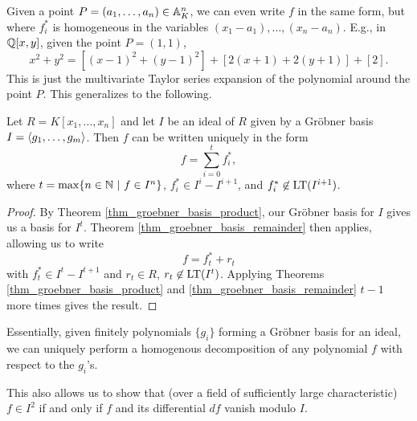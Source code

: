 Given a point $P = (a_1, \ldots, a_n) \in \mathbb{A}_K^n$, we can even write $f$ in the same form,
but where $f_i^*$ is homogeneous in the variables $(x_1 - a_1), \ldots, (x_n - a_n)$.
E.g., in $\mathbb{Q}[x,y]$, given the point $P = (1,1)$, 
\[ x^2 + y^2 = [(x - 1)^2 + (y - 1)^2] + [2(x + 1) + 2(y + 1)] + [2]. \]
This is just the multivariate Taylor series expansion of the polynomial around the point $P$.
This generalizes to the following.

\begin{theorem}
  Let $R = K[x_1, \ldots, x_n]$ and let $I$ be an ideal of $R$ given by a Gr\"obner basis $I = \left\langle g_1, \ldots, g_m \right\rangle$.
  Then $f$ can be written uniquely in the form
  \[ f = \sum_{i=0}^t f_i^*, \]
  where $t = \max\{n \in \mathbb{N} ~|~ f \in I^n\}$, $f_i^* \in I^i - I^{i+1}$, and $f_i^* \not\in \operatorname{LT}(I^{i+1})$.
\end{theorem}
\begin{proof}
  By Theorem \ref{thm_groebner_basis_product}, our Gr\"obner basis for $I$ gives us a basis for $I^t$.
  Theorem \ref{thm_groebner_basis_remainder} then applies, allowing us to write
  \[ f = f^*_t + r_t \]
  with $f^*_t \in I^t - I^{t+1}$ and $r_t \in R$, $r_t \not\in \operatorname{LT}(I^t)$.
  Applying Theorems \ref{thm_groebner_basis_product} and \ref{thm_groebner_basis_remainder} $t-1$ more times gives the result.
\end{proof}

Essentially, given finitely polynomials $\{ g_i \}$ forming a Gr\"obner basis for an ideal,
we can uniquely perform a homogenous decomposition of any polynomial $f$ with respect to the $g_i$'s.

This also allows us to show that (over a field of sufficiently large characteristic)
$f \in I^2$ if and only if $f$ and its differential $df$ vanish modulo $I$.
